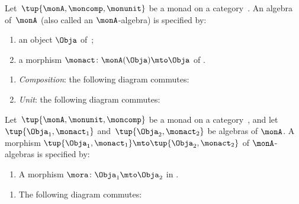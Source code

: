 \begin{ctdefinition}
    \label{def:monad-algebra}
    Let~$\tup{\monA, \moncomp, \monunit}$ be a monad on a category~\CatC.
    An algebra of~$\monA$ (also called an $\monA$-algebra) is specified by: \

    \constit
    \begin{enumerate}
        \item an object $\Obja$ of~\CatC;
        \item a morphism $\monact\colon \monA(\Obja) \mto \Obja$ of \CatC.
    \end{enumerate}
    \condit
    \begin{enumerate}
        \item \emph{Composition}: the following diagram commutes:
        \item \emph{Unit}: the following diagram commutes:

    \end{enumerate}
\end{ctdefinition}



\begin{ctdefinition}
    \label{def:algebramorphism}
    Let~$\tup{\monA, \monunit, \moncomp}$ be a monad on a category~\CatC, and let~$\tup{\Obja_1, \monact_1}$ and~$\tup{\Obja_2, \monact_2}$ be algebras of $\monA$.
    A morphism $\tup{\Obja_1, \monact_1} \mto \tup{\Obja_2, \monact_2}$ of $\monA$-algebras is specified by: \

    \constit
    \begin{enumerate}
        \item A morphism $\mora \colon \Obja_1 \mto \Obja_2$ in \CatC.
    \end{enumerate}
    \condit
    \begin{enumerate}
        \item The following diagram commutes:

    \end{enumerate}
\end{ctdefinition}

